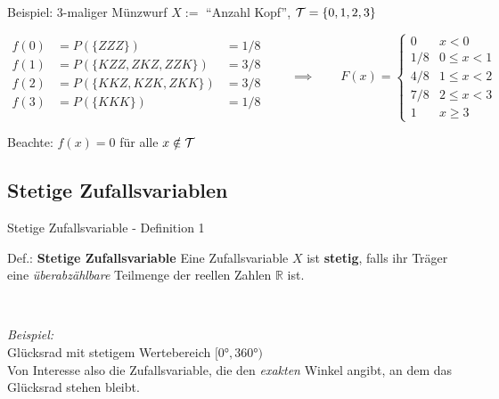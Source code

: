 \documentclass[
  10pt,
  ignorenonframetext,
]{beamer}
\begin{document}
\begin{frame}{Beispiel: 3-maliger Münzwurf}
\label{beispiel-3-maliger-muxfcnzwurf}
\(X :=\) ``Anzahl Kopf'', \({\cal{T}}=\{0,1,2,3\}\)

\[\begin{array}{lll}
f(0) &= P(\{ZZZ\}) &= 1/8\\
f(1) &= P(\{KZZ, ZKZ, ZZK\}) &= 3/8\\
f(2) &= P(\{KKZ, KZK, ZKK\}) &= 3/8\\
f(3) &= P(\{KKK\}) &= 1/8\\
\end{array}
\qquad
\implies
\qquad
F(x) = \begin{cases}
0 & x < 0 \\
1/8 & 0 \leq x < 1\\
4/8 & 1 \leq x < 2\\
7/8 & 2 \leq x < 3\\
1 & x \geq 3
\end{cases}\]

Beachte: \(f(x)=0\) für alle \(x \notin {\cal{T}}\)
\end{frame}

\subsection{Stetige Zufallsvariablen}\label{stetige-zufallsvariablen}

\begin{frame}{Stetige Zufallsvariable - Definition 1}
\label{stetige-zufallsvariable---definition-1}
\begin{block}{Def.: \textbf{Stetige Zufallsvariable}}
\label{def.-stetige-zufallsvariable}
Eine Zufallsvariable \(X\) ist \textbf{stetig}, falls ihr Träger eine
\emph{überabzählbare} Teilmenge der reellen Zahlen \(\mathbb{R}\) ist.\\
\end{block}

~

\emph{Beispiel:}\\
Glücksrad mit stetigem Wertebereich \([0°, 360°)\)\\
Von Interesse also die Zufallsvariable, die den \emph{exakten} Winkel
angibt, an dem das Glücksrad stehen bleibt.
\end{frame}
\end{document}
